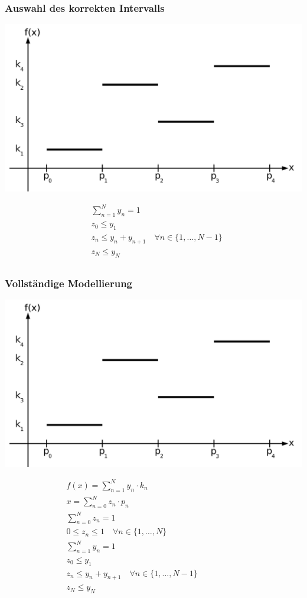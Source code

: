 \begin{frame}
 \frametitle{Auswahl des korrekten Intervalls}
 \begin{flushright}
  \includegraphics[width=.5\textwidth,page=3]{Bilder/Treppenfunktion}
 \end{flushright}
 \vspace{-5ex}
 \begin{align*}
  &\sum_{n=1}^{N}{y_n} = 1\\
  &z_0 \leq y_1\\
  &z_n \leq y_n + y_{n+1}\quad\forall n\in\{1, \ldots, N-1\}\\
  &z_N \leq y_N\\
 \end{align*}
\end{frame}

\begin{frame}
 \frametitle{Vollständige Modellierung}
 \begin{flushright}
  \includegraphics[width=.5\textwidth,page=3]{Bilder/Treppenfunktion}
 \end{flushright}
 \vspace{-15ex}\small
 \begin{align*}
  &f(x) = \sum_{n=1}^N y_n\cdot k_n\\
  &x = \sum_{n=0}^{N} z_n\cdot p_n\\
  &\sum_{n=0}^N z_n = 1\\
  &0 \leq z_n \leq 1\quad\forall n\in\{1, \ldots, N\}\\
  &\sum_{n=1}^{N}{y_n} = 1\\
  &z_0 \leq y_1\\
  &z_n \leq y_n + y_{n+1}\quad\forall n\in\{1, \ldots, N-1\}\qquad\qquad\qquad\mbox{}\\
  &z_N \leq y_N\\
 \end{align*}
\end{frame}


